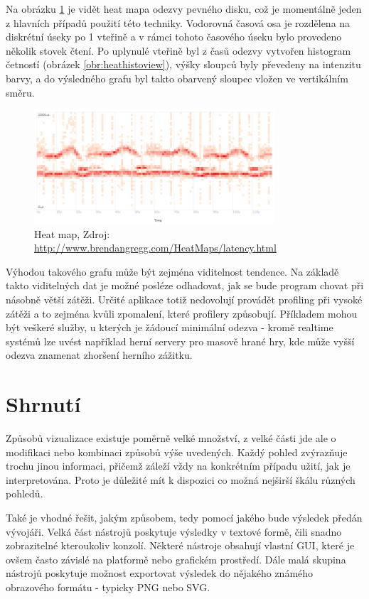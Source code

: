 \documentclass[czech,BP]{thesiskiv}
\begin{document}
Na obrázku \ref{obr:heatview} je vidět heat mapa odezvy pevného disku, což je momentálně jeden z hlavních případů použití této techniky. Vodorovná časová osa je rozdělena na diskrétní úseky po 1 vteřině a v rámci tohoto časového úseku bylo provedeno několik stovek čtení. Po uplynulé vteřině byl z časů odezvy vytvořen histogram četností (obrázek \ref{obr:heathistoview}), výšky sloupců byly převedeny na intenzitu barvy, a do výsledného grafu byl takto obarvený sloupec vložen ve vertikálním směru.

\begin{figure}[h]
    \centering
    \includegraphics[interpolate,width=0.8\textwidth]{img/prof_heatmap.png}
    \caption{Heat map, Zdroj: \url{http://www.brendangregg.com/HeatMaps/latency.html}}
    \label{obr:heatview}
\end{figure}

Výhodou takového grafu může být zejména viditelnost tendence. Na základě takto viditelných dat je možné posléze odhadovat, jak se bude program chovat při násobně větší zátěži. Určité aplikace totiž nedovolují provádět profiling při vysoké zátěži a to zejména kvůli zpomalení, které profilery způsobují. Příkladem mohou být veškeré služby, u kterých je žádoucí minimální odezva - kromě realtime systémů lze uvést například herní servery pro masově hrané hry, kde může vyšší odezva znamenat zhoršení herního zážitku.

\section{Shrnutí}

Způsobů vizualizace existuje poměrně velké množství, z velké části jde ale o modifikaci nebo kombinaci způsobů výše uvedených. Každý pohled zvýrazňuje trochu jinou informaci, přičemž záleží vždy na konkrétním případu užití, jak je interpretována. Proto je důležité mít k dispozici co možná nejširší škálu různých pohledů.

Také je vhodné řešit, jakým způsobem, tedy pomocí jakého  bude výsledek předán vývojáři. Velká část nástrojů poskytuje výsledky v textové formě, čili snadno zobrazitelné kteroukoliv konzolí. Některé nástroje obsahují vlastní GUI, které je ovšem často závislé na platformě nebo grafickém prostředí. Dále malá skupina nástrojů poskytuje možnost exportovat výsledek do nějakého známého obrazového formátu - typicky PNG nebo SVG.
\end{document}
